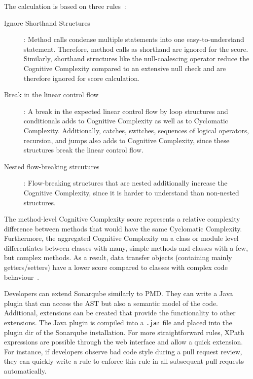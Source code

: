 The calculation is based on three rules~\cite{campbell2018cognitive}:
\begin{description}
    \item[Ignore Shorthand Structures]: Method calls condense multiple statements into one easy-to-understand statement. Therefore, method calls as shorthand are ignored for the score. Similarly, shorthand structures like the null-coalescing operator reduce the Cognitive Complexity compared to an extensive null check and are therefore ignored for score calculation.
    \item[Break in the linear control flow]: A break in the expected linear control flow by loop structures and conditionals adds to Cognitive Complexity as well as to Cyclomatic Complexity. Additionally, catches, switches, sequences of logical operators, recursion, and jumps also adds to Cognitive Complexity, since these structures break the linear control flow.
    \item[Nested flow-breaking strcutures]: Flow-breaking structures that are nested additionally increase the Cognitive Complexity, since it is harder to understand than non-nested structures.  
\end{description}
The method-level Cognitive Complexity score represents a relative complexity difference between methods that would have the same Cyclomatic Complexity. Furthermore, the aggregated Cognitive Complexity on a class or module level differentiates between classes with many, simple methods and classes with a few, but complex methods. As a result, data transfer objects (containing mainly getters/setters) have a lower score compared to classes with complex code behaviour~\cite{campbell2018cognitive}.

Developers can extend Sonarqube similarly to PMD. They can write a Java plugin that can access the AST but also a semantic model of the code. Additional, extensions can be created that provide the functionality to other extensions. The Java plugin is compiled into a \texttt{.jar} file and placed into the plugin dir of the Sonarqube installation. For more straightforward rules, XPath expressions are possible through the web interface and allow a quick extension. For instance, if developers observe bad code style during a pull request review, they can quickly write a rule to enforce this rule in all subsequent pull requests automatically.

